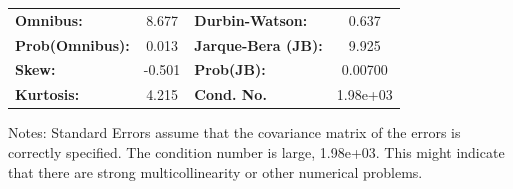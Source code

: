 \begin{center}
\begin{tabular}{lcccccc}
\bottomrule
\end{tabular}
\begin{tabular}{lclc}
\textbf{Omnibus:}       &  8.677 & \textbf{  Durbin-Watson:     } &    0.637  \\
\textbf{Prob(Omnibus):} &  0.013 & \textbf{  Jarque-Bera (JB):  } &    9.925  \\
\textbf{Skew:}          & -0.501 & \textbf{  Prob(JB):          } &  0.00700  \\
\textbf{Kurtosis:}      &  4.215 & \textbf{  Cond. No.          } & 1.98e+03  \\
\bottomrule
\end{tabular}
\end{center}

Notes: \newline
 [1] Standard Errors assume that the covariance matrix of the errors is correctly specified. \newline
 [2] The condition number is large, 1.98e+03. This might indicate that there are \newline
 strong multicollinearity or other numerical problems.
